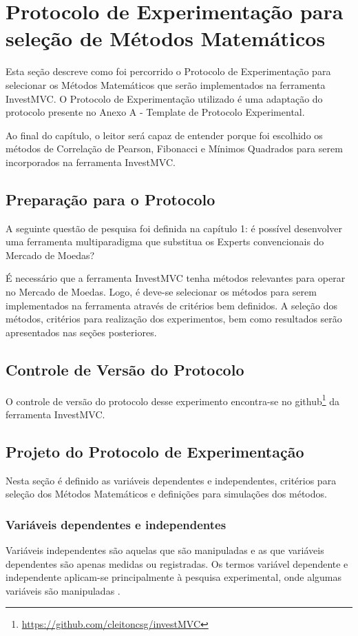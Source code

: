 \chapter{Protocolo de Experimentação para seleção de Métodos Matemáticos}

Esta seção descreve como foi percorrido o Protocolo de Experimentação para selecionar os Métodos Matemáticos que serão implementados na ferramenta InvestMVC. O Protocolo de Experimentação utilizado é uma adaptação do protocolo presente no Anexo A - Template de Protocolo Experimental.

Ao final do capítulo, o leitor será capaz de entender porque foi escolhido os métodos de Correlação de Pearson, Fibonacci e Mínimos Quadrados para serem incorporados na ferramenta InvestMVC.

\section{Preparação para o Protocolo}

A seguinte questão de pesquisa foi definida na capítulo 1: é possível desenvolver uma ferramenta multiparadigma que substitua os Experts convencionais do Mercado de Moedas? 

É necessário que a ferramenta InvestMVC tenha métodos relevantes para operar no Mercado de Moedas. Logo, é deve-se selecionar os métodos para serem implementados na ferramenta através de critérios bem definidos. A seleção dos métodos, critérios para realização dos experimentos, bem como resultados serão apresentados nas seções posteriores.

\section{Controle de Versão do Protocolo}

O controle de versão do protocolo desse experimento encontra-se no github\footnote{\url{https://github.com/cleitoncsg/investMVC}} da ferramenta InvestMVC.

\section{Projeto do Protocolo de Experimentação}

Nesta seção é definido as variáveis dependentes e independentes, critérios para seleção dos Métodos Matemáticos e definições para simulações dos métodos.


\subsection{Variáveis dependentes e independentes}
Variáveis independentes são aquelas que são manipuladas e as que variáveis dependentes são apenas medidas ou registradas. Os termos variável dependente e independente aplicam-se principalmente à pesquisa experimental, onde algumas variáveis são manipuladas \cite[pág.~13]{hoppen2010}.

